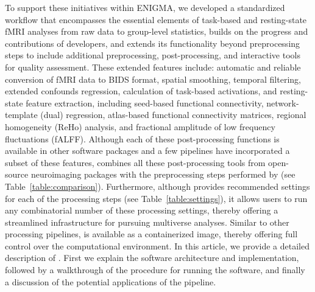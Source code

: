 To support these initiatives within ENIGMA, we developed a standardized workflow that encompasses the essential elements of task-based and resting-state fMRI analyses from raw data to group-level statistics, builds on the progress and contributions of  developers, and extends its functionality beyond preprocessing steps to include additional preprocessing, post-processing, and interactive tools for quality assessment. These extended features include: automatic and reliable conversion of fMRI data to BIDS format, spatial smoothing, temporal filtering, extended confounds regression, calculation of task-based activations, and resting-state feature extraction, including seed-based functional connectivity, network-template (dual) regression, atlas-based functional connectivity matrices, regional homogeneity (ReHo) analysis, and fractional amplitude of low frequency fluctuations (fALFF). Although each of these post-processing functions is available in other software packages and a few pipelines have incorporated a subset of these features,  combines all these post-processing tools from open-source neuroimaging packages with the preprocessing steps performed by  (see Table~\ref{table:comparison}). Furthermore, although  provides recommended settings for each of the processing steps (see Table~\ref{table:settings}), it allows users to run any combinatorial number of these processing settings, thereby offering a streamlined infrastructure for pursuing multiverse analyses. Similar to other processing pipelines,  is available as a containerized image, thereby offering full control over the computational environment. In this article, we provide a detailed description of . First we explain the software architecture and implementation, followed by a walkthrough of the procedure for running the software, and finally a discussion of the potential applications of the pipeline.



